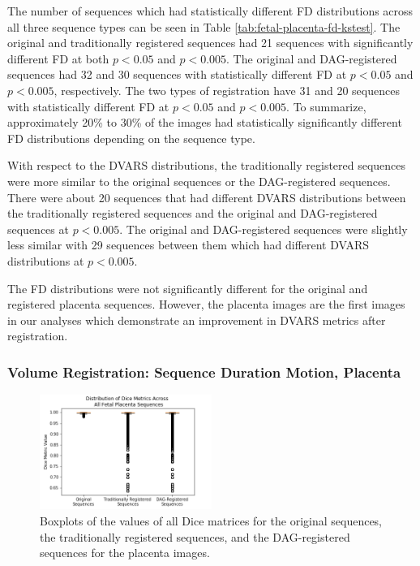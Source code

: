 The number of sequences which had statistically different FD distributions across all three sequence types can be seen in Table \ref{tab:fetal-placenta-fd-kstest}. The original and traditionally registered sequences had 21 sequences with significantly different FD at both $p < 0.05$ and $p < 0.005$. The original and DAG-registered sequences had 32 and 30 sequences with statistically different FD at $p < 0.05$ and $p < 0.005$, respectively. The two types of registration have 31 and 20 sequences with statistically different FD at $p < 0.05$ and $p < 0.005$. To summarize, approximately 20\% to 30\% of the images had statistically significantly different FD distributions depending on the sequence type.

With respect to the DVARS distributions, the traditionally registered sequences were more similar to the original sequences or the DAG-registered sequences. There were about 20 sequences that had different DVARS distributions between the traditionally registered sequences and the original and DAG-registered sequences at $p < 0.005$. The original and DAG-registered sequences were slightly less similar with 29 sequences between them which had different DVARS distributions at $p < 0.005$.

The FD distributions were not significantly different for the original and registered placenta sequences. However, the placenta images are the first images in our analyses which demonstrate an improvement in DVARS metrics after registration.

\subsubsection{Volume Registration: Sequence Duration Motion, Placenta}

\begin{figure}[t!]
\centering
\includegraphics[width=0.5\textwidth]{6/figures/fetal-placenta-dice-box.png}
\caption{Boxplots of the values of all Dice matrices for the original sequences, the traditionally registered sequences, and the DAG-registered sequences for the placenta images.}
\label{fig:fetal-placenta-dice-box}
\end{figure}

